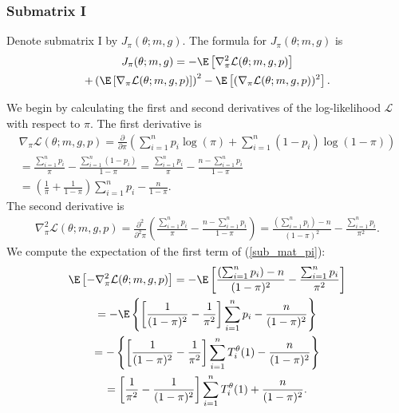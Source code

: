 \documentclass[12pt]{article}
\begin{document}
\begin{appendices}
\subsubsection*{Submatrix I}
Denote submatrix I by $J_{\pi}(\theta; m, g).$ The formula for $J_{\pi}(\theta; m, g)$ is 
\begin{multline}\label{sub_mat_pi}
J_{\pi}(\theta; m, g) = -\E\left[\nabla^2_\pi \mathcal{L}(\theta; m, g, p) \right] \\ + \left(\E\left[ \nabla_\pi \mathcal{L}(\theta; m, g, p) \right] \right)^2 - \E\left[(\nabla_\pi \mathcal{L}(\theta; m, g, p))^2 \right].
\end{multline}

We begin by calculating the first and second derivatives of the log-likelihood $\mathcal{L}$ with respect to $\pi$. The first derivative is
\begin{multline*}
\nabla_\pi \mathcal{L}(\theta; m, g, p) = \frac{\partial }{\partial \pi } \left( \sum_{i=1}^n p_i \log(\pi) + \sum_{i=1}^n (1 - p_i) \log(1 - \pi) \right) \\ = \frac{ \sum_{i=1}^n p_i }{\pi} - \frac{ \sum_{i=1}^n (1 - p_i) }{ 1 - \pi } = \frac{\sum_{i=1}^n p_i}{\pi} - \frac{n - \sum_{i=1}^n p_i}{1 - \pi} \\ = \left( \frac{1}{\pi} + \frac{1}{1 - \pi} \right) \sum_{i=1}^n p_i - \frac{n}{1-\pi}.
\end{multline*}
The second derivative is
\begin{multline*}
\nabla^2_\pi \mathcal{L}(\theta; m, g, p)  = \frac{\partial^2}{\partial^2\pi} \left( \frac{ \sum_{i=1}^n p_i }{ \pi } - \frac{ n - \sum_{i=1}^n p_i }{1 - \pi}  \right) = \frac{\left( \sum_{i=1}^n p_i \right) - n}{(1 - \pi)^2} - \frac{\sum_{i=1}^n p_i }{ \pi^2 }.
\end{multline*}
We compute the expectation of the first term of (\ref{sub_mat_pi}):
\begin{multline}\label{submat_pi_1}
\E \left[ -\nabla^2_{\pi} \mathcal{L}(\theta; m, g, p)\right] = - \E\left[\frac{ ( \sum_{i=1}^n p_i) - n}{(1 - \pi)^2} - \frac{\sum_{i=1}^n p_i}{\pi^2} \right] \\ = - \E\left\{\left[\frac{1}{(1-\pi)^2} - \frac{1}{\pi^2} \right] \sum_{i=1}^n p_i - \frac{n}{ (1 - \pi)^2 } \right\} \\ = - \left\{\left[ \frac{1}{(1-\pi)^2} - \frac{1}{\pi^2} \right] \sum_{i=1}^n T^\theta_i(1) - \frac{n}{ (1 - \pi)^2}  \right\} \\ = \left[ \frac{1}{\pi^2} - \frac{1}{(1 - \pi)^2} \right] \sum_{i=1}^n T^\theta_i(1) + \frac{n}{(1-\pi)^2}.

\end{multline}
\end{appendices}
\end{document}
